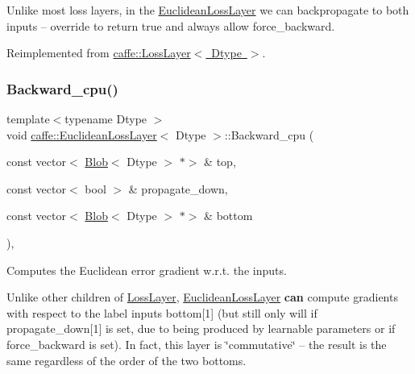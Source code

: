 Unlike most loss layers, in the \mbox{\hyperlink{classcaffe_1_1_euclidean_loss_layer}{Euclidean\+Loss\+Layer}} we can backpropagate to both inputs -- override to return true and always allow force\+\_\+backward. 

Reimplemented from \mbox{\hyperlink{classcaffe_1_1_loss_layer_a36d35155bfe0de53a79c517f33759612}{caffe\+::\+Loss\+Layer$<$ Dtype $>$}}.

\mbox{\label{classcaffe_1_1_euclidean_loss_layer_a577f5dad9889d01461348a4c89277089}} 
\subsubsection{\texorpdfstring{Backward\+\_\+cpu()}{Backward\_cpu()}\hspace{0.1cm}{\footnotesize\ttfamily [1/2]}}
{\footnotesize\ttfamily template$<$typename Dtype $>$ \\
void \mbox{\hyperlink{classcaffe_1_1_euclidean_loss_layer}{caffe\+::\+Euclidean\+Loss\+Layer}}$<$ Dtype $>$\+::Backward\+\_\+cpu (\begin{DoxyParamCaption}\item[{const vector$<$ \mbox{\hyperlink{classcaffe_1_1_blob}{Blob}}$<$ Dtype $>$ $\ast$$>$ \&}]{top,  }\item[{const vector$<$ bool $>$ \&}]{propagate\+\_\+down,  }\item[{const vector$<$ \mbox{\hyperlink{classcaffe_1_1_blob}{Blob}}$<$ Dtype $>$ $\ast$$>$ \&}]{bottom }\end{DoxyParamCaption})\hspace{0.3cm}{\ttfamily [protected]}, {\ttfamily [virtual]}}



Computes the Euclidean error gradient w.\+r.\+t. the inputs. 

Unlike other children of \mbox{\hyperlink{classcaffe_1_1_loss_layer}{Loss\+Layer}}, \mbox{\hyperlink{classcaffe_1_1_euclidean_loss_layer}{Euclidean\+Loss\+Layer}} {\bfseries can} compute gradients with respect to the label inputs bottom\mbox{[}1\mbox{]} (but still only will if propagate\+\_\+down\mbox{[}1\mbox{]} is set, due to being produced by learnable parameters or if force\+\_\+backward is set). In fact, this layer is \char`\"{}commutative\char`\"{} -- the result is the same regardless of the order of the two bottoms.


